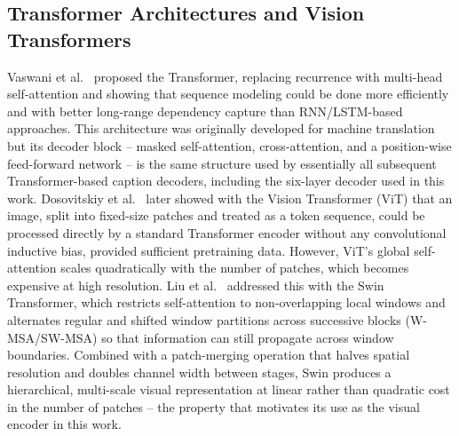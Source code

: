 \subsection{Transformer Architectures and Vision Transformers}
Vaswani et al.~\cite{vaswani2017attention} proposed the Transformer, replacing recurrence with multi-head self-attention and showing that sequence modeling could be done more efficiently and with better long-range dependency capture than RNN/LSTM-based approaches. This architecture was originally developed for machine translation but its decoder block -- masked self-attention, cross-attention, and a position-wise feed-forward network -- is the same structure used by essentially all subsequent Transformer-based caption decoders, including the six-layer decoder used in this work. Dosovitskiy et al.~\cite{dosovitskiy2020vit} later showed with the Vision Transformer (ViT) that an image, split into fixed-size patches and treated as a token sequence, could be processed directly by a standard Transformer encoder without any convolutional inductive bias, provided sufficient pretraining data. However, ViT's global self-attention scales quadratically with the number of patches, which becomes expensive at high resolution. Liu et al.~\cite{liu2021swin} addressed this with the Swin Transformer, which restricts self-attention to non-overlapping local windows and alternates regular and shifted window partitions across successive blocks (W-MSA/SW-MSA) so that information can still propagate across window boundaries. Combined with a patch-merging operation that halves spatial resolution and doubles channel width between stages, Swin produces a hierarchical, multi-scale visual representation at linear rather than quadratic cost in the number of patches -- the property that motivates its use as the visual encoder in this work.

